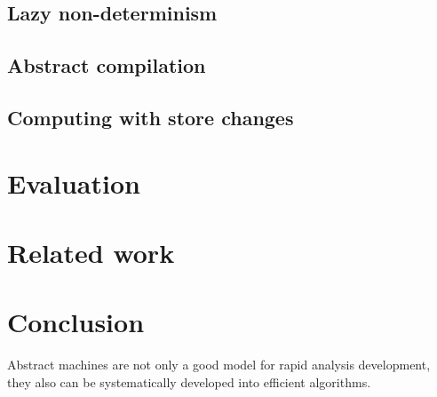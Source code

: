 \documentclass{llncs}
\begin{document}
\subsection{Lazy non-determinism}
\subsection{Abstract compilation}
\subsection{Computing with store changes}

\section{Evaluation}

\section{Related work}

\section{Conclusion}

Abstract machines are not only a good model for rapid analysis
development, they also can be systematically developed into efficient
algorithms.
\end{document}
